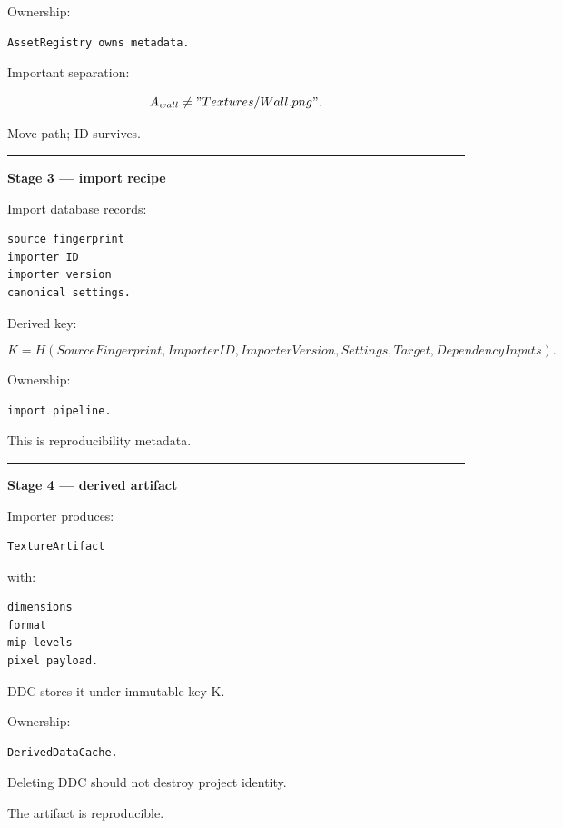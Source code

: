 Ownership:

\begin{verbatim}
AssetRegistry owns metadata.
\end{verbatim}

Important separation:

\[
A_{wall}
\neq
"Textures/Wall.png".
\]

Move path; ID survives.

\begin{center}\rule{0.5\linewidth}{0.5pt}\end{center}

\textbf{Stage 3 --- import recipe}

Import database records:

\begin{verbatim}
source fingerprint
importer ID
importer version
canonical settings.
\end{verbatim}

Derived key:

\[
K=
H(
SourceFingerprint,
ImporterID,
ImporterVersion,
Settings,
Target,
DependencyInputs
).
\]

Ownership:

\begin{verbatim}
import pipeline.
\end{verbatim}

This is reproducibility metadata.

\begin{center}\rule{0.5\linewidth}{0.5pt}\end{center}

\textbf{Stage 4 --- derived artifact}

Importer produces:

\begin{verbatim}
TextureArtifact
\end{verbatim}

with:

\begin{verbatim}
dimensions
format
mip levels
pixel payload.
\end{verbatim}

DDC stores it under immutable key K.

Ownership:

\begin{verbatim}
DerivedDataCache.
\end{verbatim}

Deleting DDC should not destroy project identity.

The artifact is reproducible.

